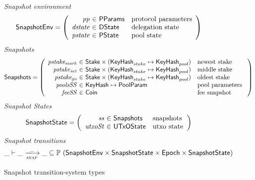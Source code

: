 \begin{figure}[htb]
  \emph{Snapshot environment}
  \begin{equation*}
    \SnapshotEnv =
    \left(
      \begin{array}{r@{~\in~}ll}
        \var{pp} & \PParams & \text{protocol parameters}\\
        \var{dstate} & \DState & \text{delegation state}\\
        \var{pstate} & \PState & \text{pool state}\\
      \end{array}
    \right)
  \end{equation*}
  \emph{Snapshots}
  \begin{equation*}
    \Snapshots =
    \left(
      \begin{array}{r@{~\in~}ll}
        \var{pstake_{mark}} & \Stake\times(\KeyHash_{stake}\mapsto\KeyHash_{pool})
                            & \text{newest stake}\\
        \var{pstake_{set}} & \Stake\times(\KeyHash_{stake}\mapsto\KeyHash_{pool})
                           & \text{middle stake}\\
        \var{pstake_{go}} & \Stake\times(\KeyHash_{stake}\mapsto\KeyHash_{pool})
                          & \text{oldest stake}\\
        \var{poolsSS} & \KeyHash \mapsto \PoolParam & \text{pool parameters }\\
        \var{feeSS} & \Coin & \text{fee snapshot}\\
      \end{array}
    \right)
  \end{equation*}
  \emph{Snapshot States}
  \begin{equation*}
    \SnapshotState =
    \left(
      \begin{array}{r@{~\in~}ll}
        \var{ss} & \Snapshots & \text{snapshots}\\
        \var{utxoSt} & \UTxOState & \text{utxo state}\\
      \end{array}
    \right)
  \end{equation*}
  \emph{Snapshot transitions}
  \begin{equation*}
    \_ \vdash
    \var{\_} \trans{snap}{\_} \var{\_}
    \subseteq \powerset (\SnapshotEnv \times \SnapshotState \times \Epoch \times \SnapshotState)
  \end{equation*}
  \caption{Snapshot transition-system types}
  \label{fig:ts-types:snapshot}
\end{figure}

